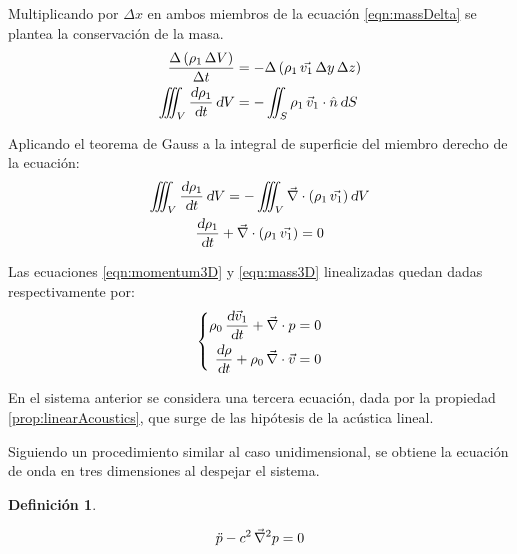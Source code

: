 \documentclass[a5paper,12pt,twoside]{book}
\newtheorem{defn}{{Definición}}[chapter]
\begin{document}

Multiplicando por $\Delta x$ en ambos miembros de la ecuación \ref{eqn:massDelta} se plantea la conservación de la masa.
\begin{align*}
    \frac{\Delta \left( \rho_1 \, \Delta V \right)}{\Delta t}
    &=
    -\Delta \left( \rho_1 \, \Vec{v_1} \, \Delta y \, \Delta z \right)
    \\
    \iiint_V \frac{\textsl{d} \rho_1}{\textsl{d} t} \, \textsl{d} V
    &=
    - \iint_S \rho_1 \, \Vec{v}_1 \cdot \hat{n} \, \textsl{d} S
\end{align*}

Aplicando el teorema de Gauss a la integral de superficie del miembro derecho de la ecuación:
\begin{gather}
    \iiint_V \frac{\textsl{d} \rho_1}{\textsl{d} t} \, \textsl{d} V
    =
    - \iiint_V \Vec{\nabla} \cdot \left( \rho_1 \, \Vec{v_1} \right) \textsl{d} V
    \notag\\
    \frac{\textsl{d} \rho_1}{\textsl{d} t} + \Vec{\nabla} \cdot \left( \rho_1 \, \Vec{v_1} \right) = 0
    \label{eqn:mass3D}
\end{gather}

Las ecuaciones \ref{eqn:momentum3D} y \ref{eqn:mass3D} linealizadas quedan dadas respectivamente por:
\begin{equation*}
    \left\{
    \begin{aligned}
        \rho_0 \, \frac{\textsl{d} \Vec{v}_1}{\textsl{d} t} + \Vec{\nabla} \cdot p &= 0
        \\
        \frac{\textsl{d} \rho}{\textsl{d} t} + \rho_0 \, \Vec{\nabla} \cdot \Vec{v} &= 0
    \end{aligned}
    \right.
\end{equation*}

En el sistema anterior se considera una tercera ecuación, dada por la propiedad \ref{prop:linearAcoustics}, que surge de las hipótesis de la acústica lineal.

Siguiendo un procedimiento similar al caso unidimensional, se obtiene la ecuación de onda en tres dimensiones al despejar el sistema.

\begin{mdframed}[style=DefinitionFrame]
    \begin{defn}
        \label{defn:soundWave3D}
    \end{defn}
    \begin{equation*}
        \ddot{p} - c^2 \, \Vec{\nabla}^2 p = 0
    \end{equation*}
\end{mdframed}
\end{document}
